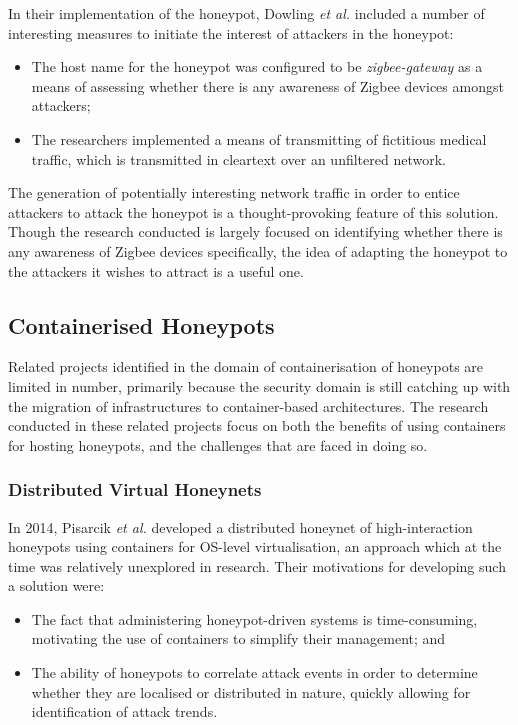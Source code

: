     In their implementation of the honeypot, Dowling \textit{et al.} included a number of interesting measures to initiate the interest of attackers in the honeypot:
    
    \begin{itemize}
    \item The host name for the honeypot was configured to be \textit{zigbee-gateway} as a means of assessing whether there is any awareness of Zigbee devices amongst attackers;
    \item The researchers implemented a means of transmitting of fictitious medical traffic, which is transmitted in cleartext over an unfiltered network. 
    \end{itemize}
    
    The generation of potentially interesting network traffic in order to entice attackers to attack the honeypot is a thought-provoking feature of this solution. Though the research conducted is largely focused on identifying whether there is any awareness of Zigbee devices specifically, the idea of adapting the honeypot to the attackers it wishes to attract is a useful one.   
  

\subsection{Containerised Honeypots} \label{RelatedHoneynetProjects}
Related projects identified in the domain of containerisation of honeypots are limited in number, primarily because the security domain is still catching up with the migration of infrastructures to container-based architectures. The research conducted in these related projects focus on both the benefits of using containers for hosting honeypots, and the challenges that are faced in doing so.

	\subsubsection{Distributed Virtual Honeynets} \label{AboutDistributedVirtualHoneynets} 
    In 2014, Pisarcik \textit{et al.} developed a distributed honeynet of high-interaction honeypots using containers for OS-level virtualisation, an approach which at the time was relatively unexplored in research. \cite{Pisarcik:2014:FDV:2659651.2659685} Their motivations for developing such a solution were:
    \begin{itemize}
    \item The fact that administering honeypot-driven systems is time-consuming, motivating the use of containers to simplify their management; and
    \item The ability of honeypots to correlate attack events in order to determine whether they are localised or distributed in nature, quickly allowing for identification of attack trends.
    \end{itemize}
    
